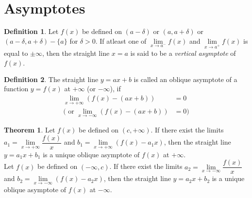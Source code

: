\documentclass[fleqn]{article}
\theoremstyle{definition}
\newtheorem{definition}{Definition}
\theoremstyle{theorem}
\newtheorem{theorem}{Theorem}
\theoremstyle{remark}
\begin{document}
\section{Asymptotes}

\begin{definition}
	Let $f(x)$ be defined on $(a - \delta)$ or $(a, a + \delta)$ or $(a - \delta, a + \delta) - \{a\}$ for $\delta > 0$. If atleast one of $\lim\limits_{x \to a^-} f(x)$ and $\lim\limits_{x \to a^+} f(x)$ is equal to $\pm \infty$, then the straight line $x = a$ is said to be a \emph{vertical asymptote} of $f(x)$.
\end{definition}

\begin{definition}
	The straight line $y = ax + b$ is called an oblique asymptote of a function $y = f(x)$ at $+ \infty$ (or $- \infty$), if 
	\begin{align*}
		\lim\limits_{x \to + \infty} (f(x) - (ax+b)) &= 0 \\
		\Big( \text{ or } \lim\limits_{x \to -\infty} (f(x) - (ax+b)) &= 0 \Big)
	\end{align*}
\end{definition}

\begin{theorem}
	Let $f(x)$ be defined on $(c, +\infty)$. If there exist the limits $a_1 = \lim\limits_{x \to +\infty} \dfrac{f(x)}{x}$ and $b_1 = \lim\limits_{x \to +\infty} (f(x) - a_1 x)$, then the straight line $y = a_1 x + b_1$ is a unique oblique asymptote of $f(x)$ at $+\infty$.\\
	Let $f(x)$ be defined on $(- \infty, c)$. If there exist the limits $a_2 = \lim\limits_{x \to -\infty} \dfrac{f(x)}{x}$ and $b_2 = \lim\limits_{x \to -\infty} (f(x) - a_2 x)$, then the straight line $y = a_2 x + b_2$ is a unique oblique asymptote of $f(x)$ at $-\infty$.
\end{theorem}
\end{document}
